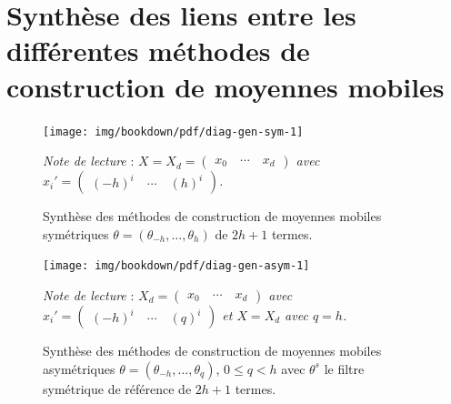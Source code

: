 \documentclass[
  12pt,
  a4paper,french]{article}
\newcommand\1{\mathds{1}}
\begin{document}
\newpage

\hypertarget{an-diag}{%
\section{Synthèse des liens entre les différentes méthodes de construction de moyennes mobiles}\label{an-diag}}

\begin{figure}[!ht]

{\centering \texttt{[image: img/bookdown/pdf/diag-gen-sym-1]} 

}

\caption[Synthèse des méthodes de construction de moyennes mobiles symétriques \(\theta=(\theta_{-h},\dots,\theta_{h})\) de \(2h+1\) termes]{Synthèse des méthodes de construction de moyennes mobiles symétriques \(\theta=(\theta_{-h},\dots,\theta_{h})\) de \(2h+1\) termes.}\label{fig:diag-gen-sym}

\footnotesize


\emph{Note de lecture} : \emph{\(X = X_d = \begin{pmatrix} x_0 \quad\cdots \quad x_d \end{pmatrix}\) avec \(x_i'=\begin{pmatrix} (-h)^i \quad \cdots \quad (h)^i\end{pmatrix}\).}
\normalsize\end{figure}

\begin{figure}[!ht]

{\centering \texttt{[image: img/bookdown/pdf/diag-gen-asym-1]} 

}

\caption[Synthèse des méthodes de construction de moyennes mobiles asymétriques \(\theta=(\theta_{-h},\dots,\theta_{q})\), \(0\leq q< h\) avec \(\theta^s\) le filtre symétrique de référence de \(2h+1\) termes]{Synthèse des méthodes de construction de moyennes mobiles asymétriques \(\theta=(\theta_{-h},\dots,\theta_{q})\), \(0\leq q< h\) avec \(\theta^s\) le filtre symétrique de référence de \(2h+1\) termes.}\label{fig:diag-gen-asym}

\footnotesize


\emph{Note de lecture} : \emph{\(X_d = \begin{pmatrix} x_0 \quad\cdots \quad x_d \end{pmatrix}\) avec \(x_i'=\begin{pmatrix} (-h)^i \quad \cdots \quad (q)^i\end{pmatrix}\) et \(X=X_d\) avec \(q=h\).}
\normalsize\end{figure}
\end{document}

